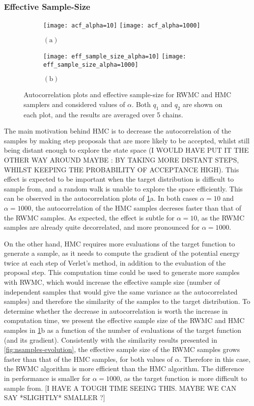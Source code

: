 \documentclass[a4paper, 12pt,oneside]{article}
\begin{document}
		\subsubsection{Effective Sample-Size}
		\begin{figure}[htb]
			\begin{subfigure}[b]{\textwidth}
				\centering
				\texttt{[image: acf\_alpha=10]}
				\texttt{[image: acf\_alpha=1000]}
				\caption*{$\mathrm{(a)}$}
			\end{subfigure}
			\begin{subfigure}[b]{\textwidth}
				\centering
				\texttt{[image: eff\_sample\_size\_alpha=10]}
				\texttt{[image: eff\_sample\_size\_alpha=1000]}
				\caption*{$\mathrm{(b)}$}
			\end{subfigure}
			\caption{Autocorrelation plots and effective sample-size for RWMC and HMC samplers and considered values of $\alpha$. Both $q_1$ and $q_2$ are shown on each plot, and the results are averaged over 5 chains.}
			\label{fig:acf-ess}
		\end{figure}
		The main motivation behind HMC is to decrease the autocorrelation of the samples by making step proposals that are more likely to be accepted, whilst still being distant enough to explore the state space (I WOULD HAVE PUT IT THE OTHER WAY AROUND MAYBE : BY TAKING MORE DISTANT STEPS, WHILST KEEPING THE PROBABILITY OF ACCEPTANCE HIGH). This effect is expected to be important when the target distribution is difficult to sample from, and a random walk is unable to explore the space efficiently.
		This can be observed in the autocorrelation plots of \ref{fig:acf-ess}a. In both cases $\alpha=10$ and $\alpha=1000$, the autocorrelation of the HMC samples decreses faster than that of the RWMC samples. As expected, the effect is subtle for $\alpha=10$, as the RWMC samples are already quite decorrelated, and more pronounced for $\alpha=1000$.

		On the other hand, HMC requires more evaluations of the target function to generate a sample, as it needs to compute the gradient of the potential energy twice at each step of Verlet's method, in addition to the evaluation of the proposal step. This computation time could be used to generate more samples with RWMC, which would increase the effective sample size (number of independent samples that would give the same variance as the autocorrelated samples) and therefore the similarity of the samples to the target distribution.
		To determine whether the decrease in autocorrelation is worth the increase in computation time, we present the effective sample size of the RWMC and HMC samples in \ref{fig:acf-ess}b as a function of the number of evaluations of the target function (and its gradient).
		Consistently with the similarity results presented in \ref{fig:nsamples-evolution}, the effective sample size of the RWMC samples grows faster than that of the HMC samples, for both values of $\alpha$. Therefore in this case, the RWMC algorithm is more efficient than the HMC algorithm.
		The difference in performance is smaller for $\alpha=1000$, as the target function is more difficult to sample from. [I HAVE A TOUGH TIME SEEING THIS. MAYBE WE CAN SAY *SLIGHTLY* SMALLER ?]
\end{document}
